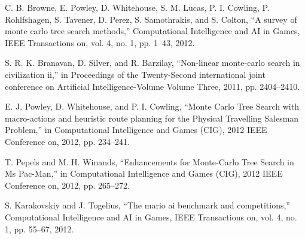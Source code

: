 \documentclass[10pt,a4paper]{article}
\begin{document}
\begin{thebibliography}{9} %
  C. B. Browne, E. Powley, D. Whitehouse, S. M. Lucas, P. I. Cowling, P. Rohlfshagen, S. Tavener, D. Perez, S. Samothrakis, and S. Colton, “A survey of monte carlo tree search methods,” Computational Intelligence and AI in Games, IEEE Transactions on, vol. 4, no. 1, pp. 1–43, 2012.

S. R. K. Branavan, D. Silver, and R. Barzilay, “Non-linear monte-carlo search in civilization ii,” in Proceedings of the Twenty-Second international joint conference on Artificial Intelligence-Volume Volume Three, 2011, pp. 2404–2410.

E. J. Powley, D. Whitehouse, and P. I. Cowling, “Monte Carlo Tree Search with macro-actions and heuristic route planning for the Physical Travelling Salesman Problem,” in Computational Intelligence and Games (CIG), 2012 IEEE Conference on, 2012, pp. 234–241.

T. Pepels and M. H. Winands, “Enhancements for Monte-Carlo Tree Search in Ms Pac-Man,” in Computational Intelligence and Games (CIG), 2012 IEEE Conference on, 2012, pp. 265–272.

S. Karakovskiy and J. Togelius, “The mario ai benchmark and competitions,” Computational Intelligence and AI in Games, IEEE Transactions on, vol. 4, no. 1, pp. 55–67, 2012.

\end{thebibliography}
\end{document}
